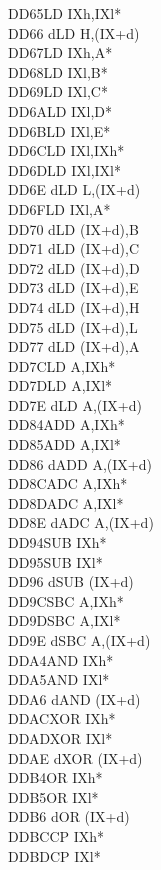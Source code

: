 \documentclass[oneside,a4paper]{book}
\begin{document}
\begin{multicols}{3}
{\begin{tabbing}
DD65\>LD IXh,IXl*\\
DD66 d\>LD H,(IX+d)\\
DD67\>LD IXh,A*\\
DD68\>LD IXl,B*\\
DD69\>LD IXl,C*\\
DD6A\>LD IXl,D*\\
DD6B\>LD IXl,E*\\
DD6C\>LD IXl,IXh*\\
DD6D\>LD IXl,IXl*\\
DD6E d\>LD L,(IX+d)\\
DD6F\>LD IXl,A*\\
DD70 d\>LD (IX+d),B\\
DD71 d\>LD (IX+d),C\\
DD72 d\>LD (IX+d),D\\
DD73 d\>LD (IX+d),E\\
DD74 d\>LD (IX+d),H\\
DD75 d\>LD (IX+d),L\\
DD77 d\>LD (IX+d),A\\
DD7C\>LD A,IXh*\\
DD7D\>LD A,IXl*\\
DD7E d\>LD A,(IX+d)\\
DD84\>ADD A,IXh*\\
DD85\>ADD A,IXl*\\
DD86 d\>ADD A,(IX+d)\\
DD8C\>ADC A,IXh*\\
DD8D\>ADC A,IXl*\\
DD8E d\>ADC A,(IX+d)\\
DD94\>SUB IXh*\\
DD95\>SUB IXl*\\
DD96 d\>SUB (IX+d)\\
DD9C\>SBC A,IXh*\\
DD9D\>SBC A,IXl*\\
DD9E d\>SBC A,(IX+d)\\
DDA4\>AND IXh*\\
DDA5\>AND IXl*\\
DDA6 d\>AND (IX+d)\\
DDAC\>XOR IXh*\\
DDAD\>XOR IXl*\\
DDAE d\>XOR (IX+d)\\
DDB4\>OR IXh*\\
DDB5\>OR IXl*\\
DDB6 d\>OR (IX+d)\\
DDBC\>CP IXh*\\
DDBD\>CP IXl*\\

\end{tabbing}}
\end{multicols}
\end{document}
